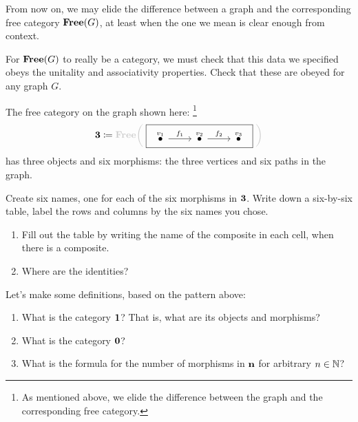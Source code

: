\documentclass[7Sketches]{subfiles}
\begin{document}
From now on, we may elide the difference between a graph and the corresponding free category $\mathbf{Free}(G)$, at least when the one we mean is clear enough from context.

\begin{exercise}%
\label{exc.free_cat}
For $\mathbf{Free}(G)$ to really be a category, we must check that this data we
specified obeys the unitality and associativity properties. Check that these
are obeyed for any graph $G$.%
\end{exercise}

\begin{exercise}%
\label{exc.free_cat2}
The free category on the graph shown here:%
\footnote{As mentioned above, we elide the difference between the graph and the corresponding free category.}
\begin{equation}%
\label{eqn.graphs_rand9851}
\Cat{3}\coloneqq{\color{black!20!white}\mathbf{Free}\bigg(}\;\raisebox{-.05in}{\fbox{
\begin{tikzcd}[ampersand replacement=\&]
	\LMO{v_1}\ar[r, "f_1"]\&\LMO{v_2}\ar[r, "f_2"]\&\LMO{v_3}
\end{tikzcd}
}}
{\color{black!20!white}\;\bigg)}
\end{equation}
has three objects and six morphisms: the three vertices and six paths in the graph.

Create six names, one for each of the six morphisms in $\mathbf{3}$. Write down a six-by-six table, label the rows and columns by the six names you chose.
\begin{enumerate}
	\item Fill out the table by writing the name of the composite in each cell, when there is a composite.
	\item Where are the identities?
\qedhere
\end{enumerate}
\end{exercise}


\begin{exercise}%
\label{exc.Cat_n}%
Let's make some definitions, based on the pattern above:
\begin{enumerate}
	\item What is the category $\mathbf{1}$? That is, what are its objects and morphisms?
	\item What is the category $\mathbf{0}$?
	\item What is the formula for the number of morphisms in $\mathbf{n}$ for arbitrary $n\in\mathbb{N}$?
\qedhere
\end{enumerate}
\end{exercise}
\end{document}
